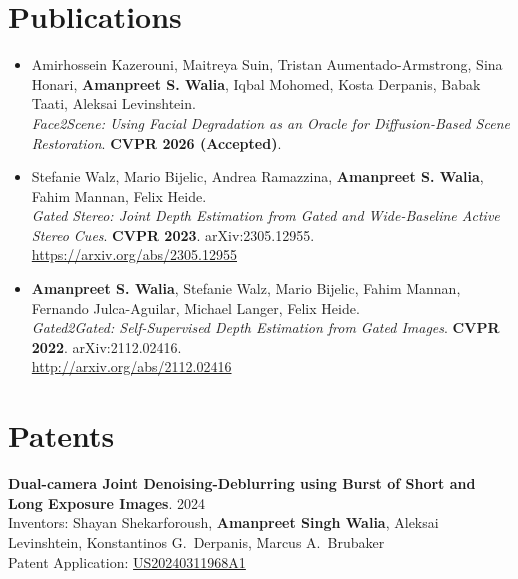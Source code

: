 \documentclass[margin, centered]{res}
\begin{document}
\begin{resume}
\section{Publications}
\begin{itemize}[leftmargin=*]
    \item Amirhossein Kazerouni, Maitreya Suin, Tristan Aumentado-Armstrong, Sina Honari, \textbf{Amanpreet S. Walia}, Iqbal Mohomed, Kosta Derpanis, Babak Taati, Aleksai Levinshtein.\\
    \textit{Face2Scene: Using Facial Degradation as an Oracle for Diffusion-Based Scene Restoration}. \textbf{CVPR 2026 (Accepted)}.

    \item Stefanie Walz, Mario Bijelic, Andrea Ramazzina, \textbf{Amanpreet S. Walia}, Fahim Mannan, Felix Heide.\\
    \textit{Gated Stereo: Joint Depth Estimation from Gated and Wide-Baseline Active Stereo Cues}. \textbf{CVPR 2023}. arXiv:2305.12955.\\
    \href{https://arxiv.org/abs/2305.12955}{https://arxiv.org/abs/2305.12955}

    \item \textbf{Amanpreet S. Walia}, Stefanie Walz, Mario Bijelic, Fahim Mannan, Fernando Julca-Aguilar, Michael Langer, Felix Heide.\\
    \textit{Gated2Gated: Self-Supervised Depth Estimation from Gated Images}. \textbf{CVPR 2022}. arXiv:2112.02416.\\
    \href{http://arxiv.org/abs/2112.02416}{http://arxiv.org/abs/2112.02416}
\end{itemize}

\section{Patents}
\vspace{-0.1cm}

\textbf{Dual-camera Joint Denoising-Deblurring using Burst of Short and Long Exposure Images}. \hfill 2024\\
Inventors: Shayan Shekarforoush, \textbf{Amanpreet Singh Walia}, Aleksai Levinshtein, Konstantinos G.\ Derpanis, Marcus A.\ Brubaker\\
Patent Application: \href{https://patents.google.com/patent/US20240311968A1/en}{US20240311968A1}

\end{resume}
\end{document}
